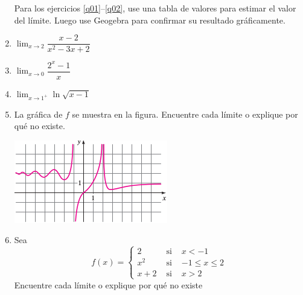 \documentclass[letterpaper,11pt,twoside]{article}
\begin{document}
\begin{multicols}{2}
\begin{enumerate}
Para los ejercicios \ref{q01}--\ref{q02}, use una tabla de valores para estimar el valor del límite. Luego use Geogebra para confirmar su resultado gráficamente.
\item \label{q01} $\displaystyle{\lim_{x\rightarrow 2}\dfrac{x-2}{x^{2}-3x+2}}$
\item $\displaystyle{\lim_{x\rightarrow 0}\dfrac{2^{x}-1}{x}}$
\item \label{q02} $\displaystyle{\lim_{x\rightarrow 1^{+}}\ln\sqrt{x-1} }$
\item La gráfica de $f$ se muestra en la figura. Encuentre cada límite o explique por qué no existe.
\begin{center}
\includegraphics[scale=.75]{Images/Screenshot01.png} 
\end{center}
\begin{enumerate}
\end{enumerate}
\item Sea \[f(x)= \left\{ \begin{array}{lcl}
2 & \mbox{ si } & x<-1 \\
x^{2} & \mbox{ si } & -1\leq x\leq 2\\
x+2 & \mbox{ si } & x>2
\end{array}
\right.\]
Encuentre cada límite o explique por qué no existe
\begin{enumerate}

\end{enumerate}
\end{enumerate}
\end{multicols}
\end{document}

